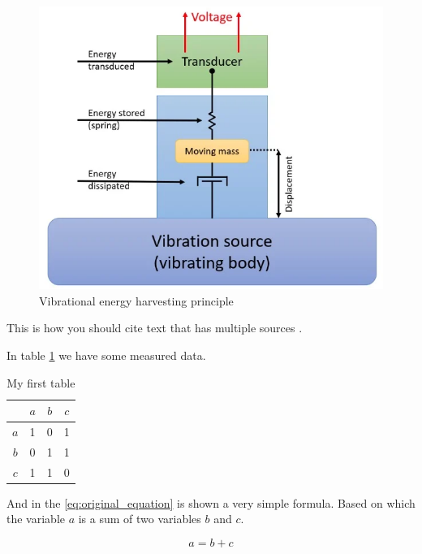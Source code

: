 \begin{figure}[ht]
	\centering
	\includegraphics[width=1.0\linewidth]{pictures/vibrational_energy_harvesting}
	\caption{Vibrational energy harvesting principle \cite{figure_second}}
	\label{fig:vibrationalenergyharvesting}
\end{figure}

This is how you should cite text that has multiple sources \cite{article_first, article_second}.

In table \ref{tab:first_table} we have some measured data.

\begin{table}[ht]
	\centering
	\caption{My first table}
	\label{tab:first_table}
	\begin{tabular}{|c|c|c|c|}
		\hline
		& $a$ & $b$ & $c$ \\
		\hline
		$a$ & 1 & 0 & 1 \\
		\hline
		$b$ & 0 & 1 & 1 \\
		\hline
		$c$ & 1 & 1 & 0 \\
		\hline
	\end{tabular}
\end{table}

And in the \eqref{eq:original_equation} is shown a very simple formula. Based on which the variable $a$ is a sum of two variables $b$ and $c$.

\begin{equation}
	\label{eq:original_equation}
	a = b + c
\end{equation}

